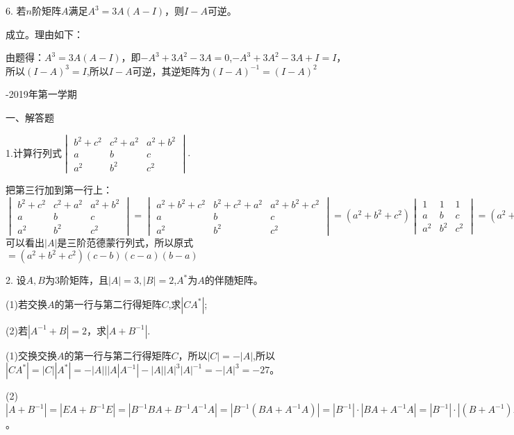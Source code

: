 \documentclass{article}
\begin{document}
6. 若$n$阶矩阵$A$满足$A^{3}=3A(A-I)$，则$I-A$可逆。

\begin{jie}
成立。理由如下：

由题得：$A^{3}=3A(A-I)$，即$-A^{3}+3A^{2}-3A=0$,$-A^{3}+3A^{2}-3A+I=I$，所以$(I-A)^{3}=I$,所以$I-A$可逆，其逆矩阵为$(I-A)^{-1}=(I-A)^{2}$
\end{jie}

\newpage
\hphantom{~~}\hfill {-2019年第一学期} \hfill\hphantom{~~}

一、解答题

1.计算行列式$
\begin{vmatrix}
  b^{2}+c^{2} & c^{2}+a^{2} & a^{2}+b^{2} \\
  a & b & c \\
  a^{2} & b^{2} & c^{2}
\end{vmatrix}
.$

\begin{jie}
把第三行加到第一行上：
\begin{equation*}
\begin{vmatrix}
  b^{2}+c^{2} & c^{2}+a^{2} & a^{2}+b^{2} \\
  a & b & c \\
  a^{2} & b^{2} & c^{2}
\end{vmatrix}=\begin{vmatrix}
  a^{2}+b^{2}+c^{2} & b^{2}+c^{2}+a^{2} & a^{2}+b^{2}+c^{2} \\
  a & b & c \\
  a^{2} & b^{2} & c^{2}
\end{vmatrix}=(a^{2}+b^{2}+c^{2})\begin{vmatrix}
  1 & 1 & 1 \\
  a & b & c \\
  a^{2} & b^{2} & c^{2}
\end{vmatrix}=(a^{2}+b^{2}+c^{2})|A|
\end{equation*}
可以看出$|A|$是三阶范德蒙行列式，所以原式$=(a^{2}+b^{2}+c^{2})(c-b)(c-a)(b-a)$
\end{jie}

2. 设$A,B$为3阶矩阵，且$|A|=3,|B|=2$,$A^{*}$为$A$的伴随矩阵。

(1)若交换$A$的第一行与第二行得矩阵$C$,求$|CA^{*}|$;

(2)若$|A^{-1}+B|=2$，求$|A+B^{-1}|$.

\begin{jie}
(1)交换交换$A$的第一行与第二行得矩阵$C$，所以$|C|=-|A|$,所以$|CA^{*}|=|C||A^{*}|=-|A|||A|A^{-1}|-|A||A|^{3}|A|^{-1}=-|A|^3=-27$。

(2) $|A+B^{-1}|=|EA+B^{-1}E|=|B^{-1}BA+B^{-1}A^{-1}A|=|B^{-1}(BA+A^{-1}A)|=|B^{-1}|\cdot|BA+A^{-1}A|=|B^{-1}|\cdot|(B+A^{-1})A|=|B^{-1}|\cdot|(B+A^{-1})|\cdot|A|=2^{-1}\times2\times3=3$。
\end{jie}
\end{document}
